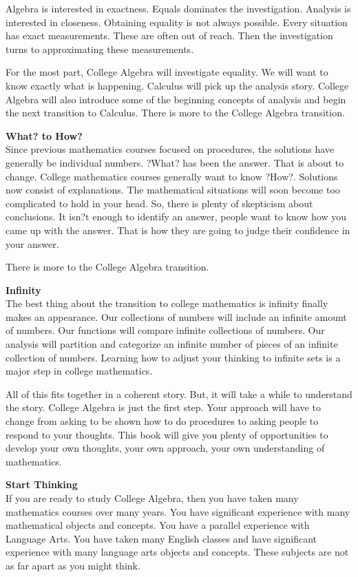 \documentclass{ximera}
\begin{document}
Algebra is interested in exactness.  Equals dominates the investigation. Analysis is interested in closeness.  Obtaining equality is not always possible.  Every situation has exact measurements. These are often out of reach.  Then the investigation turns to approximating these measurements.

For the most part, College Algebra will investigate equality.  We will want to know exactly what is happening. Calculus will pick up the analysis story. College Algebra will also introduce some of the beginning concepts of analysis and begin the next transition to Calculus.
There is more to the College Algebra transition.

\textbf{What? to How?} \\
Since previous mathematics courses focused on procedures, the solutions have generally be individual numbers.  ?What? has been the answer.  That is about to change. College mathematics courses generally want to know ?How?. Solutions now consist of explanations. 
The mathematical situations will soon become too complicated to hold in your head.  So, there is plenty of skepticism about conclusions. It isn?t enough to identify an answer, people want to know how you came up with the answer.  That is how they are going to judge their confidence in your answer.  

There is more to the College Algebra transition.

\textbf{Infinity} \\
The best thing about the transition to college mathematics is infinity finally makes an appearance. Our collections of numbers will include an infinite amount of numbers. Our functions will compare infinite collections of numbers. Our analysis will partition and categorize an infinite number of pieces of an infinite collection of numbers. Learning how to adjust your thinking to infinite sets is a major step in college mathematics.


All of this fits together in a coherent story. But, it will take a while to understand the story.  College Algebra is just the first step. Your approach will have to change from asking to be shown how to do procedures to asking people to respond to your thoughts. This book will give you plenty of opportunities to develop your own thoughts, your own approach, your own understanding of mathematics.

\textbf{Start Thinking} \\
If you are ready to study College Algebra, then you have taken many mathematics courses over many years. You have significant experience with many mathematical objects and concepts. You have a parallel experience with Language Arts.  You have taken many English classes and have significant experience with many language arts objects and concepts. These subjects are not as far apart as you might think.
\end{document}
